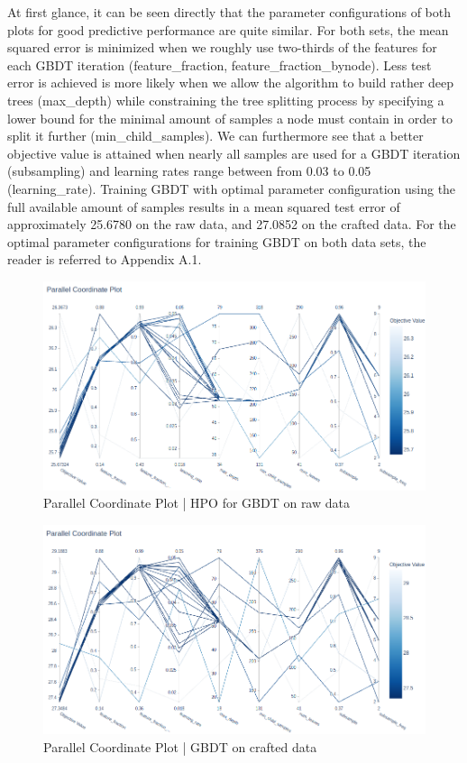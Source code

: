 At first glance, it can be seen directly that the parameter configurations of both plots for good predictive performance are quite similar. For both sets, the mean squared error is minimized when we roughly use two-thirds of the features for each GBDT iteration (feature\_fraction, feature\_fraction\_bynode). Less test error is achieved is more likely when we allow the algorithm to build rather deep trees (max\_depth) while constraining the tree splitting process by specifying a lower bound for the minimal amount of samples a node must contain in order to split it further (min\_child\_samples). We can furthermore see that a better objective value is attained when nearly all samples are used for a GBDT iteration (subsampling) and learning rates range between from 0.03 to 0.05 (learning\_rate).
Training GBDT with optimal parameter configuration using the full available amount of samples results in a mean squared test error of approximately 25.6780 on the raw data, and 27.0852 on the crafted data.
For the optimal parameter configurations for training GBDT on both data sets, the reader is referred to Appendix A.1.
\begin{figure}[h]
	\centering
	\includegraphics[width=\linewidth]
	{figures/HPO/GBDT_HPO_Raw_ParallelPlot.png}
	\caption{Parallel Coordinate Plot | HPO for GBDT on raw data}
	\label{fig:GBDT_HPO_Raw_ParallelPlot}
\end{figure}
\begin{figure}[h]
	\centering
	\includegraphics[width=\linewidth]{figures/HPO/GBDT_HPO_Crafted_ParallelPlot.png}
	\caption{Parallel Coordinate Plot | GBDT on crafted data}
	\label{fig:GBDT_HPO_Crafted_ParallelPlot}
\end{figure}


